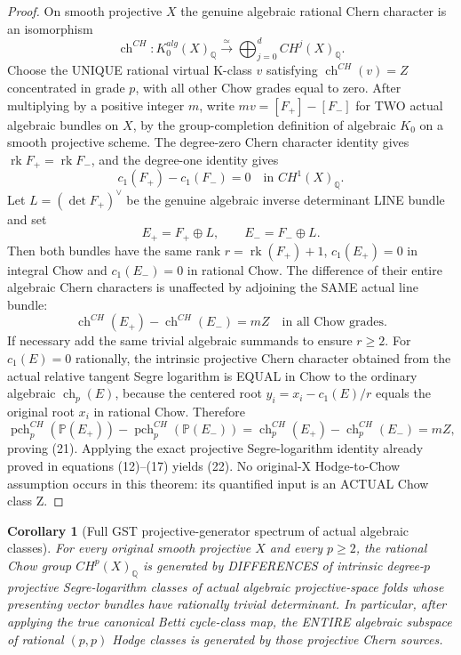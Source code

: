 \documentclass[11pt]{article}
\newtheorem{corollary}[theorem]{Corollary}
\begin{document}
\begin{proof}
On smooth projective $X$ the genuine algebraic rational
Chern character is an isomorphism
\[
 \operatorname{ch}^{CH}:
  K_0^{alg}(X)_{\mathbb Q}
   \overset{\simeq}{\longrightarrow}
  \bigoplus_{j=0}^{d}CH^j(X)_{\mathbb Q}.
\]
Choose the UNIQUE rational virtual K-class $v$
satisfying $\operatorname{ch}^{CH}(v)=Z$ concentrated
in grade $p$, with all other Chow grades equal to zero.
After multiplying by a positive integer $m$,
write $mv=[F_+]-[F_-]$ for TWO actual algebraic
bundles on $X$, by the group-completion definition
of algebraic $K_0$ on a smooth projective scheme.
The degree-zero Chern character identity gives
$\operatorname{rk}F_+=\operatorname{rk}F_-$,
and the degree-one identity gives
\[
   c_1(F_+)-c_1(F_-)=0
      \quad\text{in }CH^1(X)_{\mathbb Q}.
\]
Let $L=(\det F_+)^\vee$ be the genuine
algebraic inverse determinant LINE bundle and set
\[
  E_+=F_+\oplus L,\qquad
  E_-=F_-\oplus L .
\]
Then both bundles have the same rank
$r=\operatorname{rk}(F_+)+1$,
$c_1(E_+)=0$ in integral Chow and
$c_1(E_-)=0$ in rational Chow.
The difference of their entire algebraic Chern
characters is unaffected by adjoining the
SAME actual line bundle:
\[
  \operatorname{ch}^{CH}(E_+)
      -\operatorname{ch}^{CH}(E_-)
  =m Z \quad\text{in all Chow grades}.
\]
If necessary add the same trivial algebraic summands
to ensure $r\ge2$. For $c_1(E)=0$ rationally, the
intrinsic projective Chern character obtained
from the actual relative tangent Segre logarithm
is EQUAL in Chow to the ordinary algebraic
$\operatorname{ch}_p(E)$, because the centered root
$y_i=x_i-c_1(E)/r$ equals the original root
$x_i$ in rational Chow.
Therefore
\[
 \operatorname{pch}^{CH}_p(\mathbb P(E_+))
 -\operatorname{pch}^{CH}_p(\mathbb P(E_-))
 =\operatorname{ch}^{CH}_p(E_+)
  -\operatorname{ch}^{CH}_p(E_-)=m Z,
\]
proving (21). Applying the exact projective
Segre-logarithm identity already proved
in equations (12)--(17) yields (22).
No original-X Hodge-to-Chow assumption occurs
in this theorem: its quantified input is an
ACTUAL Chow class Z.
\end{proof}

\begin{corollary}[Full GST projective-generator spectrum of actual algebraic classes]
For every original smooth projective $X$ and every
$p\ge2$, the rational Chow group $CH^p(X)_{\mathbb Q}$
is generated by DIFFERENCES of intrinsic degree-$p$
projective Segre-logarithm classes of actual
algebraic projective-space folds whose presenting
vector bundles have rationally trivial determinant.
In particular, after applying the true canonical
Betti cycle-class map, the ENTIRE algebraic
subspace of rational $(p,p)$ Hodge classes is
generated by those projective Chern sources.
\end{corollary}
\end{document}
